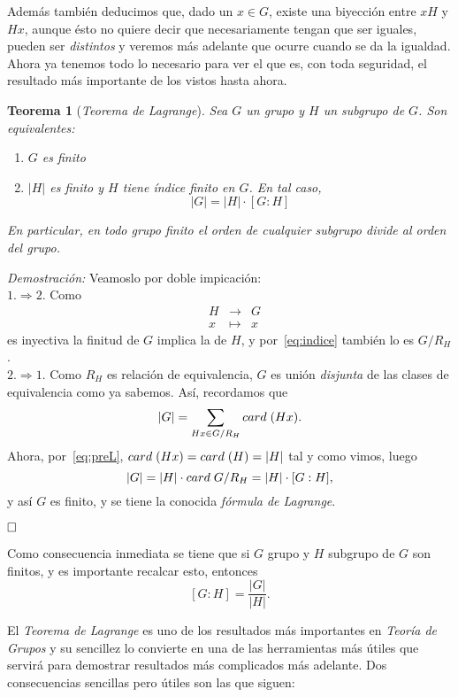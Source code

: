 \documentclass[12pt]{article}
\newtheorem{theorem}{Teorema}[section]
\begin{document}
Además también deducimos que, dado un $x \in G$, existe una biyección entre $xH$ y $Hx$, aunque ésto no quiere decir que necesariamente tengan que ser iguales, pueden ser \textit{distintos} y veremos más adelante que ocurre cuando se da la igualdad. Ahora ya tenemos todo lo necesario para ver el que es, con toda seguridad, el resultado más importante de los vistos hasta ahora.

\begin{theorem}[\textit{Teorema de Lagrange}]
Sea $G$ un grupo y $H$ un subgrupo de $G$. Son equivalentes:
\begin{enumerate}
\item $G$ es finito
\item $|H|$ es finito y $H$ tiene índice finito en $G$. En tal caso, $$|G| = |H|\cdot \left[ G:H \right]$$
\end{enumerate}
 En particular, en todo grupo finito el orden de cualquier subgrupo divide al orden del grupo.
\end{theorem}
\emph{Demostración: } Veamoslo por doble impicación:\vspace{0.2cm}\\
$1. \Rightarrow 2.$ Como $$\begin{array}{rccl}
&H & \longrightarrow & G\\
&x & \longmapsto &x
\end{array}$$ es inyectiva la finitud de $G$ implica la de $H$, y por~\ref{eq:indice} también lo es $G/R_{H}$.\vspace{0.2cm}\\
$2. \Rightarrow 1.$ Como $R_{H}$ es relación de equivalencia, $G$ es unión \textit{disjunta} de las clases de equivalencia como ya sabemos. Así, recordamos que $$|G| = \sum_{Hx\in G/R_{H}} card \hspace{0.1cm} (Hx).$$ Ahora, por~\ref{eq:preL}, $card \hspace{0.1cm} (Hx) = card \hspace{0.1cm} (H) = |H|$ tal y como vimos, luego $$|G| = |H| \cdot card \hspace{0.1cm} G/R_{H} = |H| \cdot [G: H],$$ y así $G$ es finito, y se tiene la conocida \textit{fórmula de Lagrange}.

$\hfill \square$

Como consecuencia inmediata se tiene que si $G$ grupo y $H$ subgrupo de $G$ son finitos, y es importante recalcar esto, entonces $$\left[ G:H \right] = \frac{|G|}{|H|}.$$

El \textit{Teorema de Lagrange} es uno de los resultados más importantes en \textit{Teoría de Grupos} y su sencillez lo convierte en una de las herramientas más útiles que servirá para demostrar resultados más complicados más adelante. Dos consecuencias sencillas pero útiles son las que siguen: 
\end{document}
